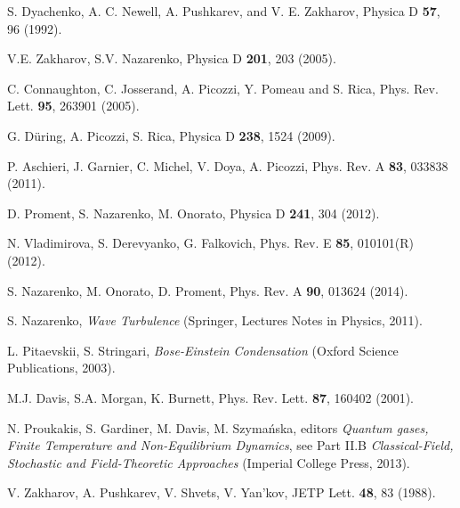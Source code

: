 \documentclass[pra,twocolumn,showpacs,preprintnumbers,amsmath,amssymb]{revtex4}
\begin{document}
\begin{thebibliography}{99}


S. Dyachenko, A. C. Newell, A. Pushkarev, and V. E. Zakharov, 
Physica D {\bf 57}, 96 (1992).


V.E. Zakharov, S.V. Nazarenko, 
Physica D {\bf 201}, 203 (2005).

C. Connaughton, C. Josserand, A. Picozzi, Y. Pomeau and S. Rica, Phys. Rev. Lett. {\bf 95}, 263901 (2005).

G. D\"{u}ring, A. Picozzi, S. Rica, 
Physica D {\bf 238}, 1524 (2009).

P. Aschieri, J. Garnier, C. Michel, V. Doya, A. Picozzi,
Phys. Rev. A {\bf 83}, 033838 (2011).


D. Proment, S. Nazarenko, M. Onorato, 
Physica D {\bf 241}, 304 (2012).

N. Vladimirova, S. Derevyanko, G. Falkovich,
Phys. Rev. E {\bf 85}, 010101(R) (2012).


S. Nazarenko, M. Onorato, D. Proment,
Phys. Rev. A {\bf 90}, 013624 (2014).


S. Nazarenko, {\it Wave Turbulence} (Springer, Lectures Notes in Physics, 2011).



L. Pitaevskii, S. Stringari,
{\it Bose-Einstein Condensation}
(Oxford Science Publications, 2003).

M.J. Davis, S.A. Morgan, K. Burnett, 
Phys. Rev. Lett. {\bf 87}, 160402 (2001). 

N. Proukakis, S. Gardiner, M. Davis, M. Szyma\'nska, editors
{\it Quantum gases, Finite Temperature and Non-Equilibrium Dynamics}, see Part II.B  {\it Classical-Field, Stochastic and Field-Theoretic Approaches} (Imperial College Press, 2013). 



V. Zakharov, A. Pushkarev, V. Shvets, V. Yan'kov, 
JETP Lett. {\bf 48}, 83 (1988).


\end{thebibliography}
\end{document}

